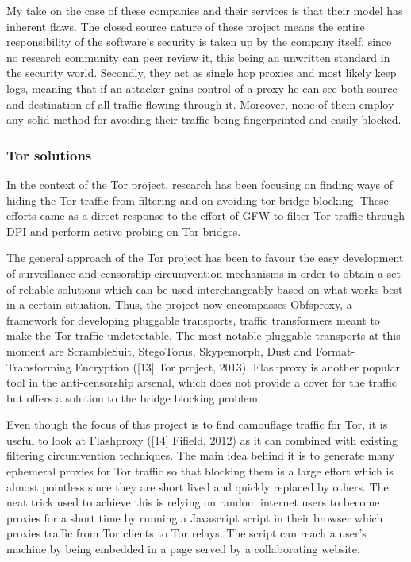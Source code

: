 \documentclass[11pt]{article} %
\begin{document}
My take on the case of these companies and their services is that their model has inherent flaws.  The closed source nature of these project means the entire responsibility of the software’s security is taken up by the company itself, since no research community can peer review it, this being an unwritten standard in the security world. Secondly, they act as single hop proxies and most likely keep logs, meaning that if an attacker gains control of a proxy he can see both source and destination of all traffic flowing through it. Moreover, none of them employ any solid method for avoiding their traffic being fingerprinted and easily blocked.

\subsubsection{Tor solutions}

In the context of the Tor project, research has been focusing on finding ways of hiding the Tor traffic from filtering and on avoiding tor bridge blocking. These efforts came as a direct response to the effort of GFW to filter Tor traffic through DPI and perform active probing on Tor bridges.

The general approach of the Tor project has been to favour the easy development of surveillance and censorship circumvention mechanisms in order to obtain a set of reliable solutions which can be used interchangeably based on what works best in a certain situation. Thus, the project now encompasses Obfsproxy, a framework for developing pluggable transports, traffic transformers meant to make the Tor traffic undetectable. The most notable pluggable transports at this moment are ScrambleSuit, StegoTorus, Skypemorph, Dust and Format-Transforming Encryption ([13] Tor project, 2013). Flashproxy is another popular tool in the anti-censorship arsenal, which does not provide a cover for the traffic but offers a solution to the bridge blocking problem.


Even though the focus of this project is to find camouflage traffic for Tor, it is useful to look at Flashproxy ([14] Fifield, 2012) as it can combined with existing filtering circumvention techniques. The main idea behind it is to generate many ephemeral proxies for Tor traffic so that blocking them is a large effort which is almost pointless since they are short lived and quickly replaced by others. The neat trick used to achieve this is relying on random internet users to become proxies for a short time by running a Javascript script in their browser which proxies traffic from Tor clients to Tor relays. The script can reach a user’s machine by being embedded in a page served by a collaborating website. 
\end{document}
